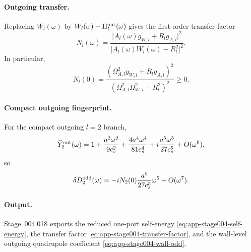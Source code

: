 \paragraph{Outgoing transfer.}
Replacing \(W_l(\omega)\) by \(W_l(\omega)-\Pi_l^{\rm out}(\omega)\) gives
the first-order transfer factor
\begin{equation}
\label{eq:app-stage004-transfer-factor}
N_l(\omega)=
\frac{\bigl[A_l(\omega)g_{W,l}+R_lg_{A,l}\bigr]^2}
{\bigl[A_l(\omega)W_l(\omega)-R_l^2\bigr]^2}.
\end{equation}
In particular,
\begin{equation}
\label{eq:app-stage004-n0-positive}
N_l(0)=
\frac{(\Omega_{A,l}^2g_{W,l}+R_lg_{A,l})^2}
{(\Omega_{A,l}^2\Omega_{W,l}^2-R_l^2)^2}\ge0.
\end{equation}

\paragraph{Compact outgoing fingerprint.}
For the compact outgoing \(l=2\) branch,
\begin{equation}
\label{eq:app-stage004-outgoing-fingerprint}
\widehat Y_2^{\rm out}(\omega)
=1+\frac{a^2\omega^2}{9c_s^2}
+\frac{4a^4\omega^4}{81c_s^4}
+i\frac{a^5\omega^5}{27c_s^5}
+O(\omega^6),
\end{equation}
so
\begin{equation}
\label{eq:app-stage004-wall-odd}
\delta D_2^{\rm odd}(\omega)
=-iN_2(0)\frac{a^5}{27c_s^5}\omega^5+O(\omega^7).
\end{equation}

\paragraph{Output.}
Stage~004.018 exports the reduced one-port self-energy
\eqref{eq:app-stage004-self-energy}, the transfer factor
\eqref{eq:app-stage004-transfer-factor}, and the wall-level outgoing
quadrupole coefficient \eqref{eq:app-stage004-wall-odd}.
